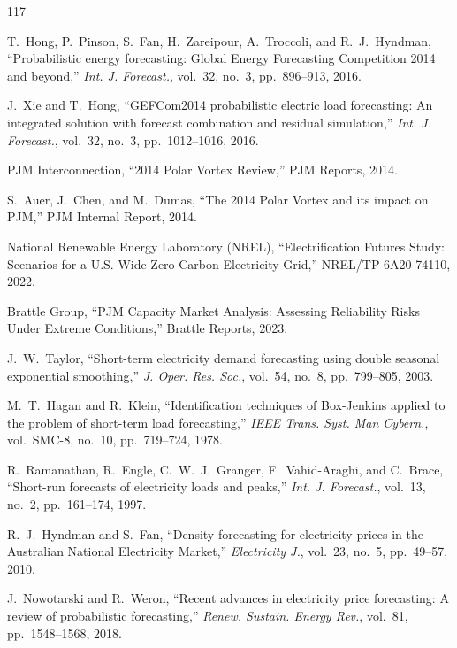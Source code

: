 \documentclass[12pt,a4paper]{article}
\begin{document}
\begin{thebibliography}{117}

 T.~Hong, P.~Pinson, S.~Fan, H.~Zareipour, A.~Troccoli, and R.~J.~Hyndman, ``Probabilistic energy forecasting: Global Energy Forecasting Competition 2014 and beyond,'' \textit{Int. J. Forecast.}, vol.~32, no.~3, pp.~896--913, 2016.

 J.~Xie and T.~Hong, ``GEFCom2014 probabilistic electric load forecasting: An integrated solution with forecast combination and residual simulation,'' \textit{Int. J. Forecast.}, vol.~32, no.~3, pp.~1012--1016, 2016.

 PJM Interconnection, ``2014 Polar Vortex Review,'' PJM Reports, 2014.

 S.~Auer, J.~Chen, and M.~Dumas, ``The 2014 Polar Vortex and its impact on PJM,'' PJM Internal Report, 2014.

 National Renewable Energy Laboratory (NREL), ``Electrification Futures Study: Scenarios for a U.S.-Wide Zero-Carbon Electricity Grid,'' NREL/TP-6A20-74110, 2022.

 Brattle Group, ``PJM Capacity Market Analysis: Assessing Reliability Risks Under Extreme Conditions,'' Brattle Reports, 2023.

 J.~W.~Taylor, ``Short-term electricity demand forecasting using double seasonal exponential smoothing,'' \textit{J. Oper. Res. Soc.}, vol.~54, no.~8, pp.~799--805, 2003.

 M.~T.~Hagan and R.~Klein, ``Identification techniques of Box-Jenkins applied to the problem of short-term load forecasting,'' \textit{IEEE Trans. Syst. Man Cybern.}, vol.~SMC-8, no.~10, pp.~719--724, 1978.

 R.~Ramanathan, R.~Engle, C.~W.~J.~Granger, F.~Vahid-Araghi, and C.~Brace, ``Short-run forecasts of electricity loads and peaks,'' \textit{Int. J. Forecast.}, vol.~13, no.~2, pp.~161--174, 1997.

 R.~J.~Hyndman and S.~Fan, ``Density forecasting for electricity prices in the Australian National Electricity Market,'' \textit{Electricity J.}, vol.~23, no.~5, pp.~49--57, 2010.

 J.~Nowotarski and R.~Weron, ``Recent advances in electricity price forecasting: A review of probabilistic forecasting,'' \textit{Renew. Sustain. Energy Rev.}, vol.~81, pp.~1548--1568, 2018.


\end{thebibliography}
\end{document}
